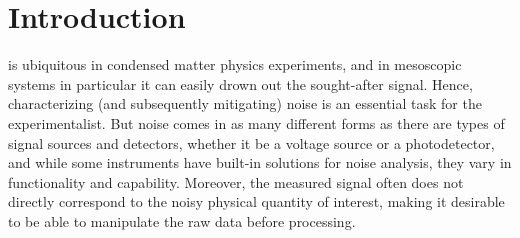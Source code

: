 \chapter{Introduction}\label{ch:speck:introduction}
 is ubiquitous in condensed matter physics experiments, and in mesoscopic systems in particular it can easily drown out the sought-after signal.
Hence, characterizing (and subsequently mitigating) noise is an essential task for the experimentalist.
But noise comes in as many different forms as there are types of signal sources and detectors, whether it be a voltage source or a photodetector, and while some instruments have built-in solutions for noise analysis, they vary in functionality and capability.
Moreover, the measured signal often does not directly correspond to the noisy physical quantity of interest, making it desirable to be able to manipulate the raw data before processing.

